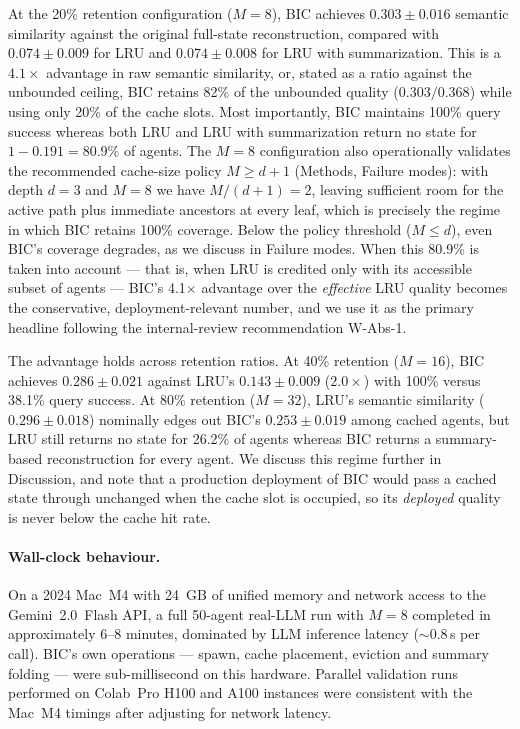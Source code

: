 \documentclass[fleqn,10pt]{article}
\theoremstyle{definition}
\newcommand{\slots}{M}
\begin{document}
At the 20\% retention configuration ($\slots{=}8$), BIC achieves
$0.303 \pm 0.016$ semantic similarity against the original full-state
reconstruction, compared with $0.074 \pm 0.009$ for LRU and
$0.074 \pm 0.008$ for LRU with summarization. This is a
$4.1\times$ advantage in raw semantic similarity, or, stated as a
ratio against the unbounded ceiling, BIC retains 82\% of the
unbounded quality ($0.303 / 0.368$) while using only 20\% of the
cache slots. Most importantly, BIC maintains 100\% query success
whereas both LRU and LRU with summarization return no state for
$1-0.191 = 80.9\%$ of agents. The $\slots{=}8$ configuration also
operationally validates the recommended cache-size policy
$\slots \geq d + 1$ (Methods, Failure modes): with depth $d{=}3$
and $\slots = 8$ we have $\slots / (d{+}1) = 2$, leaving
sufficient room for the active path plus immediate ancestors at
every leaf, which is precisely the regime in which BIC retains
100\% coverage. Below the policy threshold ($\slots \leq d$),
even BIC's coverage degrades, as we discuss in Failure modes. When this 80.9\% is taken into account
--- that is, when LRU is credited only with its accessible subset
of agents --- BIC's 4.1$\times$ advantage over the \emph{effective}
LRU quality becomes the conservative, deployment-relevant number, and
we use it as the primary headline following the internal-review
recommendation W-Abs-1.

The advantage holds across retention ratios. At 40\% retention
($\slots{=}16$), BIC achieves $0.286 \pm 0.021$ against LRU's
$0.143 \pm 0.009$ ($2.0\times$) with 100\% versus 38.1\% query
success. At 80\% retention ($\slots{=}32$), LRU's semantic similarity
($0.296 \pm 0.018$) nominally edges out BIC's $0.253 \pm 0.019$
among cached agents, but LRU still returns no state for 26.2\% of
agents whereas BIC returns a summary-based reconstruction for every
agent. We discuss this regime further in Discussion, and note that a
production deployment of BIC would pass a cached state through
unchanged when the cache slot is occupied, so its \emph{deployed}
quality is never below the cache hit rate.

\paragraph{Wall-clock behaviour.}
On a 2024 Mac~M4 with 24~GB of unified memory and network access to
the Gemini~2.0~Flash API, a full 50-agent real-LLM run with
$\slots{=}8$ completed in approximately 6--8 minutes, dominated by
LLM inference latency ($\sim$0.8\,s per call). BIC's own operations
--- spawn, cache placement, eviction and summary folding --- were
sub-millisecond on this hardware. Parallel validation runs performed
on Colab~Pro H100 and A100 instances were consistent with the Mac~M4
timings after adjusting for network latency.
\end{document}
